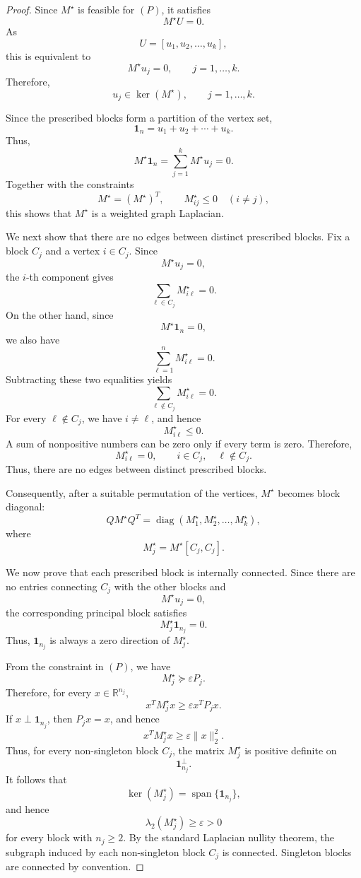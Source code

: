 \documentclass[11pt]{article}
\begin{document}
\begin{proof}
	Since $M^\star$ is feasible for $(P)$, it satisfies
	\[
	M^\star U=0.
	\]
	As
	\[
	U=[u_1,u_2,\ldots,u_k],
	\]
	this is equivalent to
	\[
	M^\star u_j=0,\qquad j=1,\ldots,k.
	\]
	Therefore,
	\[
	u_j\in\ker(M^\star),\qquad j=1,\ldots,k.
	\]
	
	Since the prescribed blocks form a partition of the vertex set,
	\[
	\mathbf 1_n=u_1+u_2+\cdots+u_k.
	\]
	Thus,
	\[
	M^\star\mathbf 1_n
	=
	\sum_{j=1}^{k}M^\star u_j
	=
	0.
	\]
	Together with the constraints
	\[
	M^\star=(M^\star)^T,
	\qquad
	M^\star_{ij}\le0\quad (i\ne j),
	\]
	this shows that $M^\star$ is a weighted graph Laplacian.
	
	We next show that there are no edges between distinct prescribed blocks. Fix a block $C_j$ and a vertex $i\in C_j$. Since
	\[
	M^\star u_j=0,
	\]
	the $i$-th component gives
	\[
	\sum_{\ell\in C_j}M^\star_{i\ell}=0.
	\]
	On the other hand, since
	\[
	M^\star\mathbf 1_n=0,
	\]
	we also have
	\[
	\sum_{\ell=1}^{n}M^\star_{i\ell}=0.
	\]
	Subtracting these two equalities yields
	\[
	\sum_{\ell\notin C_j}M^\star_{i\ell}=0.
	\]
	For every $\ell\notin C_j$, we have $i\ne \ell$, and hence
	\[
	M^\star_{i\ell}\le0.
	\]
	A sum of nonpositive numbers can be zero only if every term is zero. Therefore,
	\[
	M^\star_{i\ell}=0,
	\qquad
	i\in C_j,\quad \ell\notin C_j.
	\]
	Thus, there are no edges between distinct prescribed blocks.
	
	Consequently, after a suitable permutation of the vertices, $M^\star$ becomes block diagonal:
	\[
	Q M^\star Q^T
	=
	\operatorname{diag}(M^\star_1,M^\star_2,\ldots,M^\star_k),
	\]
	where
	\[
	M^\star_j=M^\star[C_j,C_j].
	\]
	
	We now prove that each prescribed block is internally connected. Since there are no entries connecting $C_j$ with the other blocks and
	\[
	M^\star u_j=0,
	\]
	the corresponding principal block satisfies
	\[
	M^\star_j\mathbf 1_{n_j}=0.
	\]
	Thus, $\mathbf 1_{n_j}$ is always a zero direction of $M^\star_j$.
	
	From the constraint in $(P)$, we have
	\[
	M^\star_j\succeq \varepsilon P_j.
	\]
	Therefore, for every $x\in\mathbb R^{n_j}$,
	\[
	x^TM^\star_jx\ge \varepsilon x^TP_jx.
	\]
	If $x\perp \mathbf 1_{n_j}$, then $P_jx=x$, and hence
	\[
	x^TM^\star_jx\ge \varepsilon\|x\|_2^2.
	\]
	Thus, for every non-singleton block $C_j$, the matrix $M^\star_j$ is positive definite on
	\[
	\mathbf 1_{n_j}^{\perp}.
	\]
	It follows that
	\[
	\ker(M^\star_j)=\operatorname{span}\{\mathbf 1_{n_j}\},
	\]
	and hence
	\[
	\lambda_2(M^\star_j)\ge\varepsilon>0
	\]
	for every block with $n_j\ge2$. By the standard Laplacian nullity theorem, the subgraph induced by each non-singleton block $C_j$ is connected. Singleton blocks are connected by convention.
	

\end{proof}
\end{document}
